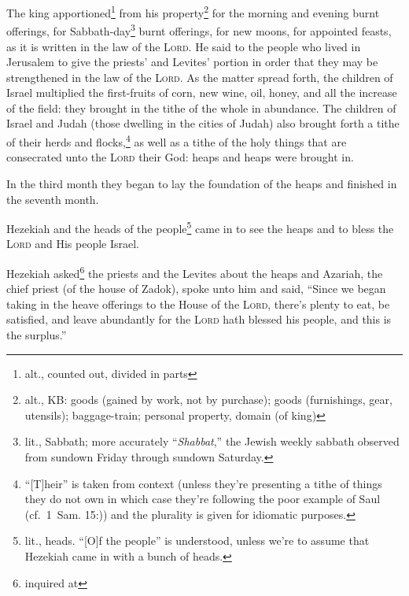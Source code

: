 \begin{inparaenum}
     The king apportioned\footnote{alt., counted out, divided in parts} from his property\footnote{alt., KB: goods (gained by work, not by purchase); goods (furnishings, gear, utensils); baggage-train; personal property, domain (of king)} for the morning and evening burnt offerings, for Sabbath-day\footnote{lit., Sabbath; more accurately ``\textit{Shabbat},'' the Jewish weekly sabbath observed from sundown Friday through sundown Saturday.} burnt offerings, for new moons, for appointed feasts, as it is written in the law of the \textsc{Lord}.%
     He said to the people who lived in Jerusalem to give the priests' and Levites' portion in order that they may be strengthened in the law of the \textsc{Lord}.%
     As the matter spread forth, the children of Israel multiplied the first-fruits of corn, new wine, oil, honey, and all the increase of the field: they brought in the tithe of the whole in abundance.%
     The children of Israel and Judah (those dwelling in the cities of Judah) also brought forth a tithe of their herds and flocks,\footnote{``[T]heir'' is taken from context (unless they're presenting a tithe of things they do not own in which case they're following the poor example of Saul (cf.~1~Sam. 15\thinspace:)) and the plurality is given for idiomatic purposes.} as well as a tithe of the holy things that are consecrated unto the \textsc{Lord} their God: heaps and heaps were brought in.%
    
     In the third month they began to lay the foundation of the heaps and finished in the seventh month.%
    
     Hezekiah and the heads of the people\footnote{lit., heads. ``[O]f the people'' is understood, unless we're to assume that Hezekiah came in with a bunch of heads.} came in to see the heaps and to bless the \textsc{Lord} and His people Israel.%
    
     Hezekiah asked\footnote{inquired at} the priests and the Levites about the heaps%
     and Azariah, the chief priest (of the house of Zadok), spoke unto him and said, ``Since we began taking in the heave offerings to the House of the \textsc{Lord}, there's plenty to eat, be satisfied, and leave abundantly for the \textsc{Lord} hath blessed his people, and this is the surplus.''%
    

\end{inparaenum}
